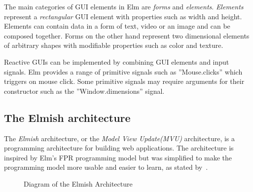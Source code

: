 The main categories of GUI elements in Elm are \emph{forms} and \emph{elements}.
\emph{Elements} represent a \emph{rectangular} GUI element with properties such as width and height. Elements
can contain data in a form of text, video or an image and can be composed together.
Forms on the other hand represent two dimensional elements of arbitrary shapes with
modifiable properties such as color and texture.

Reactive GUIs can be implemented by combining GUI elements and input signals.
Elm provides a range of primitive signals such as ”Mouse.clicks” which triggers on
mouse click. Some primitive signals may require arguments for their constructor such
as the ”Window.dimensions” signal.

\subsection{The Elmish architecture}
\label{sub:elmish}

The \emph{Elmish} architecture, or the \emph{Model View Update(MVU)} architecture, is a programming architecture for building web applications.
The architecture is inspired by Elm's FPR programming model but was simplified to make the programming model more usable and easier to learn, as stated by~\citet{news/farewell-to-frp_2024}.

\begin{figure}[htbp]
	\caption{Diagram of the Elmish Architecture}
	\label{fig:elm}
\end{figure}

